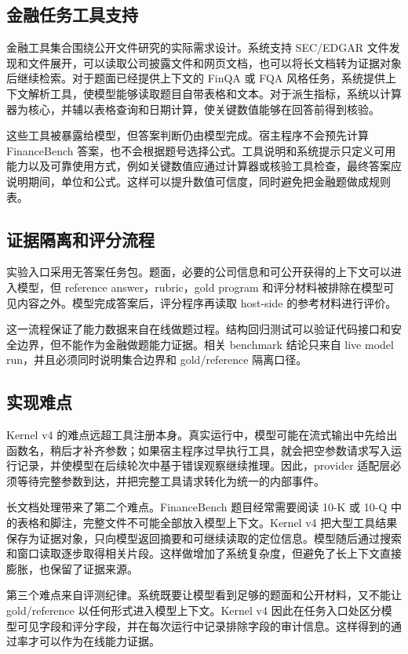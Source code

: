 \documentclass[12pt,a4paper,UTF8]{ctexart}
\begin{document}
\subsection{金融任务工具支持}

金融工具集合围绕公开文件研究的实际需求设计。系统支持 SEC/EDGAR 文件发现和文件展开，可以读取公司披露文件和网页文档，也可以将长文档转为证据对象后继续检索。对于题面已经提供上下文的 FinQA 或 FQA 风格任务，系统提供上下文解析工具，使模型能够读取题目自带表格和文本。对于派生指标，系统以计算器为核心，并辅以表格查询和日期计算，使关键数值能够在回答前得到核验。

这些工具被暴露给模型，但答案判断仍由模型完成。宿主程序不会预先计算 FinanceBench 答案，也不会根据题号选择公式。工具说明和系统提示只定义可用能力以及可靠使用方式，例如关键数值应通过计算器或核验工具检查，最终答案应说明期间，单位和公式。这样可以提升数值可信度，同时避免把金融题做成规则表。

\subsection{证据隔离和评分流程}

实验入口采用无答案任务包。题面，必要的公司信息和可公开获得的上下文可以进入模型，但 reference answer，rubric，gold program 和评分材料被排除在模型可见内容之外。模型完成答案后，评分程序再读取 host-side 的参考材料进行评价。

这一流程保证了能力数据来自在线做题过程。结构回归测试可以验证代码接口和安全边界，但不能作为金融做题能力证据。相关 benchmark 结论只来自 live model run，并且必须同时说明集合边界和 gold/reference 隔离口径。

\subsection{实现难点}

Kernel v4 的难点远超工具注册本身。真实运行中，模型可能在流式输出中先给出函数名，稍后才补齐参数；如果宿主程序过早执行工具，就会把空参数请求写入运行记录，并使模型在后续轮次中基于错误观察继续推理。因此，provider 适配层必须等待完整参数到达，并把完整工具请求转化为统一的内部事件。

长文档处理带来了第二个难点。FinanceBench 题目经常需要阅读 10-K 或 10-Q 中的表格和脚注，完整文件不可能全部放入模型上下文。Kernel v4 把大型工具结果保存为证据对象，只向模型返回摘要和可继续读取的定位信息。模型随后通过搜索和窗口读取逐步取得相关片段。这样做增加了系统复杂度，但避免了长上下文直接膨胀，也保留了证据来源。

第三个难点来自评测纪律。系统既要让模型看到足够的题面和公开材料，又不能让 gold/reference 以任何形式进入模型上下文。Kernel v4 因此在任务入口处区分模型可见字段和评分字段，并在每次运行中记录排除字段的审计信息。这样得到的通过率才可以作为在线能力证据。
\end{document}
